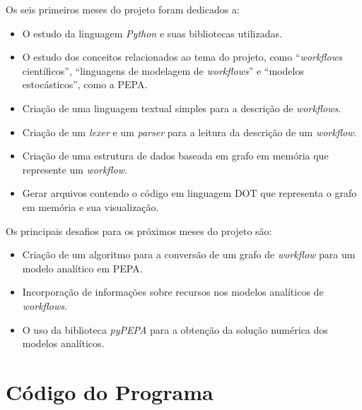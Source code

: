 \documentclass[a4paper,11pt]{article}
\begin{document}
  	Os seis primeiros meses do projeto foram dedicados a:
  	\begin{itemize}
  		\item O estudo da linguagem \emph{Python} e suas bibliotecas utilizadas.
  		\item O estudo dos conceitos relacionados ao tema do projeto, como ``\emph{workflows} científicos'', ``linguagens de modelagem de \emph{workflows}'' e ``modelos estocásticos'', como a PEPA.
  		\item Criação de uma linguagem textual simples para a descrição de \emph{workflows}.
  		\item Criação de um \emph{lexer} e um \emph{parser} para a leitura da descrição de um \emph{workflow}.
  		\item Criação de uma estrutura de dados baseada em grafo em memória que represente um \emph{workflow}.
  		\item Gerar arquivos contendo o código em linguagem DOT que representa o grafo em memória e sua visualização.
  	\end{itemize}

  	Os principais desafios para os próximos meses do projeto são:
  	\begin{itemize}
  		\item Criação de um algoritmo para a conversão de um grafo de \emph{workflow} para um modelo analítico em PEPA.
  		\item Incorporação de informações sobre recursos nos modelos analíticos de \emph{workflows}.
  		\item O uso da biblioteca \emph{pyPEPA} para a obtenção da solução numérica dos modelos analíticos. 
  	\end{itemize}

  \newpage
  
  

  \newpage
  \appendix
  \section{Código do Programa}
  	
  	
\end{document}
